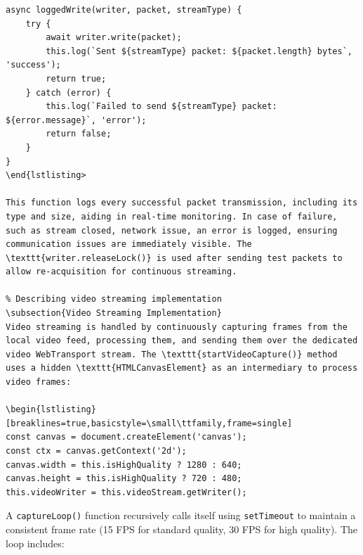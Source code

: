 \begin{lstlisting}[breaklines=true,basicstyle=\small\ttfamily,frame=single]
async loggedWrite(writer, packet, streamType) {
    try {
        await writer.write(packet);
        this.log(`Sent ${streamType} packet: ${packet.length} bytes`, 'success');
        return true;
    } catch (error) {
        this.log(`Failed to send ${streamType} packet: ${error.message}`, 'error');
        return false;
    }
}
\end{lstlisting>

This function logs every successful packet transmission, including its type and size, aiding in real-time monitoring. In case of failure, such as stream closed, network issue, an error is logged, ensuring communication issues are immediately visible. The \texttt{writer.releaseLock()} is used after sending test packets to allow re-acquisition for continuous streaming.

% Describing video streaming implementation
\subsection{Video Streaming Implementation}
Video streaming is handled by continuously capturing frames from the local video feed, processing them, and sending them over the dedicated video WebTransport stream. The \texttt{startVideoCapture()} method uses a hidden \texttt{HTMLCanvasElement} as an intermediary to process video frames:

\begin{lstlisting}[breaklines=true,basicstyle=\small\ttfamily,frame=single]
const canvas = document.createElement('canvas');
const ctx = canvas.getContext('2d');
canvas.width = this.isHighQuality ? 1280 : 640;
canvas.height = this.isHighQuality ? 720 : 480;
this.videoWriter = this.videoStream.getWriter();
\end{lstlisting}

A \texttt{captureLoop()} function recursively calls itself using \texttt{setTimeout} to maintain a consistent frame rate (15 FPS for standard quality, 30 FPS for high quality). The loop includes:

